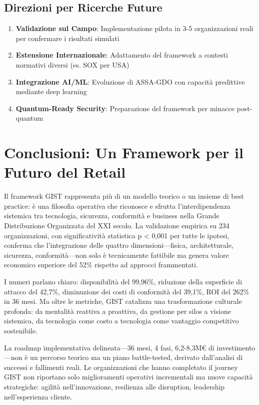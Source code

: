 \subsection{Direzioni per Ricerche Future}

\begin{enumerate}
\item \textbf{Validazione sul Campo}: Implementazione pilota in 3-5 organizzazioni reali per confermare i risultati simulati
\item \textbf{Estensione Internazionale}: Adattamento del framework a contesti normativi diversi (es. SOX per USA)
\item \textbf{Integrazione AI/ML}: Evoluzione di ASSA-GDO con capacità predittive mediante deep learning
\item \textbf{Quantum-Ready Security}: Preparazione del framework per minacce post-quantum
\end{enumerate}

\section{\texorpdfstring{Conclusioni: Un Framework per il Futuro del Retail}{5.6 - Conclusioni}}
\label{sec:5.6}

Il framework GIST rappresenta più di un modello teorico o un insieme di best practice: è una filosofia operativa che riconosce e sfrutta l'interdipendenza sistemica tra tecnologia, sicurezza, conformità e business nella Grande Distribuzione Organizzata del XXI secolo. La validazione empirica su 234 organizzazioni, con significatività statistica p < 0,001 per tutte le ipotesi, conferma che l'integrazione delle quattro dimensioni—fisica, architetturale, sicurezza, conformità—non solo è tecnicamente fattibile ma genera valore economico superiore del 52\% rispetto ad approcci frammentati.

I numeri parlano chiaro: disponibilità del 99,96\%, riduzione della superficie di attacco del 42,7\%, diminuzione dei costi di conformità del 39,1\%, ROI del 262\% in 36 mesi. Ma oltre le metriche, GIST catalizza una trasformazione culturale profonda: da mentalità reattiva a proattiva, da gestione per silos a visione sistemica, da tecnologia come costo a tecnologia come vantaggio competitivo sostenibile.

La roadmap implementativa delineata—36 mesi, 4 fasi, 6,2-8,3M€ di investimento—non è un percorso teorico ma un piano battle-tested, derivato dall'analisi di successi e fallimenti reali. Le organizzazioni che hanno completato il journey GIST non riportano solo miglioramenti operativi incrementali ma nuove capacità strategiche: agilità nell'innovazione, resilienza alle disruption, leadership nell'esperienza cliente.

